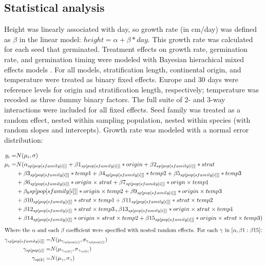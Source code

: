 \documentclass[12pt]{article}\usepackage[]{graphicx}\usepackage[]{color}
\begin{document}
	\subsection{Statistical analysis}
	Height was linearly associated with day, so growth rate (in cm/day) was defined as $\beta$ in the linear model: $height = \alpha + \beta*day $. This growth rate was calculated for each seed that germinated. Treatment effects on growth rate, germination rate, and germination timing were modeled with Bayesian hierachical mixed effects models \parencite{Gelman2004}. For all models, stratification length, continental origin, and temperature were treated as binary fixed effects. Europe and 30 days were reference levels for origin and stratification length, respectively; temperature was recoded as three dummy binary factors. The full suite of 2- and 3-way interactions were included for all fixed effects. Seed family was treated as a random effect, nested within sampling population, nested within species (with random slopes and intercepts). Growth rate was modeled with a normal error distribution: 

\begin{align}
y_i =&  N(\mu_i,\sigma)\\
  \mu_i =&  N(\alpha_{sp[pop[sfamily[i]]]} + \beta 1_{sp[pop[sfamily[i]]]}*origin +  \beta 2_{sp[pop[sfamily[i]]]} * strat\\
          & +\beta 3_{sp[pop[sfamily[i]]]}*temp1 +  \beta 4_{sp[pop[sfamily[i]]]}*temp2 + \beta 5_{sp[pop[sfamily[i]]]}*temp3 \notag \\
          & 
 		 + \beta 6_{sp[pop[sfamily[i]]]}*origin\times strat  + \beta 7_{sp[pop[sfamily[i]]]}*orign \times temp1 \notag\\ &
 		 + \beta_8{sp[pop[sfamily[i]]]}*origin \times temp2 + \beta 9_{sp[pop[sfamily[i]]]}*origin \times temp3 \notag \\ &
 		 +\beta 10_{sp[pop[sfamily[i]]]}*strat\times temp1 +\beta 11_{sp[pop[sfamily[i]]]}*strat \times temp2 \notag \\ &
 		 + \beta 12_{sp[pop[sfamily[i]]]}*strat \times temp3_ + \beta 13_{sp[pop[sfamily[i]]]}*origin \times strat \times temp1 \notag\\ &
 		 +\beta 14_{sp[pop[sfamily[i]]]}*origin \times strat \times temp2 + \beta 15_{sp[pop[sfamily[i]]]}*origin \times strat \times temp3 )\notag
 \end{align}
 \begin{align}
 		 \intertext{Where the $\alpha$ and each $\beta$ coefficient were specified with nested random effects. For each $\gamma$ in $[\alpha,\beta 1:\beta 15]$:}
 		 \gamma_{sp[pop[sfamily[i]]]} =& N(\mu_{\gamma_{sp[pop[j]]}}, \sigma_{\gamma_{sp[pop[j]]}}) \\
 		 \gamma_{sp[pop[j]]} = & N(\mu_{\gamma_{sp[k]}}, \sigma_{\gamma_{sp[k]}}) \\
 		 \gamma_{sp[k]} = & N(\mu_{\gamma}, \sigma_{\gamma})
\end{align}
\end{document}
